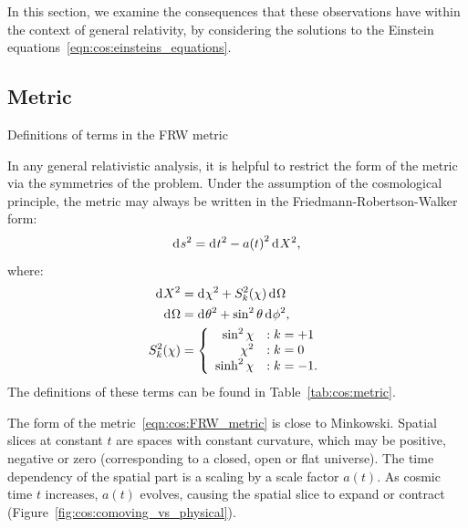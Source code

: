 In this section, we examine the consequences that these observations have within the context of general relativity, by considering the solutions to the Einstein equations~\ref{eqn:cos:einsteins_equations}.

\subsection{Metric}
\begin{table}[tp]
  \centering
  
\caption{Definitions of terms in the FRW metric}\label{tab:cos:metric}
\end{table}

In any general relativistic analysis, it is helpful to restrict the form of the metric via the symmetries of the problem.
Under the assumption of the cosmological principle, the metric may always be written in the Friedmann-Robertson-Walker form:
\begin{equation}
  \operatorname{d}^{}\!{s}^2 = \operatorname{d}^{}\!{t}^2 - a{(t)}^2 \operatorname{d}^{}\!{X}^2,
  \label{eqn:cos:FRW_metric}
\end{equation}
where:
\begin{align}
  \operatorname{d}^{}\!{X}^2 &= \operatorname{d}^{}\!{\chi}^2 + S_k^2{(\chi)} \operatorname{d}^{}\!{\Omega}
  \label{eqn:cos:space_element}\\
  \operatorname{d}^{}\!{\Omega} &= \operatorname{d}^{}\!{\theta}^2 + \sin^2\theta \operatorname{d}^{}\!{\phi}^2,
  \label{eqn:cos:angle_element}\\
  S_k^2(\chi) &=
  \left\{
  \begin{array}{rl}
    \sin^2\chi &: k=+1 \\
    \chi^2 &: k=0 \\
    \sinh^2\chi &: k=-1. \\
  \end{array}
  \right.\label{eqn:cos:S_def}
\end{align}
The definitions of these terms can be found in Table~\ref{tab:cos:metric}. 

The form of the metric~\eqref{eqn:cos:FRW_metric} is close to Minkowski. Spatial slices at constant $t$ are spaces with constant curvature, which may be positive, negative or zero (corresponding to a closed, open or flat universe). The time dependency of the spatial part is a scaling by a scale factor $a(t)$. As cosmic time $t$ increases, $a(t)$ evolves, causing the spatial slice to expand or contract (Figure~\ref{fig:cos:comoving_vs_physical}). 



